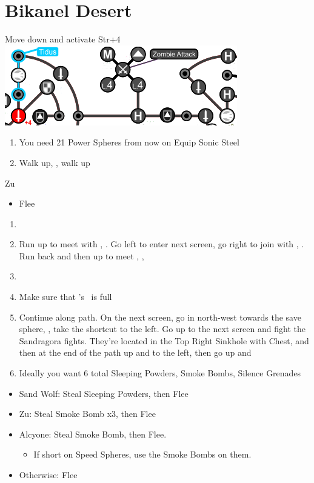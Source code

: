 \chapter{Bikanel Desert}
\begin{spheregrid}
\begin{itemize}
	\tidusf Move down and activate Str+4
	\includegraphics[width=.8\columnwidth]{graphics/tidus_bikanel}
\end{itemize}
\end{spheregrid}
\begin{enumerate}
	\item You need 21 Power Spheres from now on
	\tidusf Equip Sonic Steel
	\item Walk up, \sd, walk up
\end{enumerate}
\begin{battle}{Zu}
\begin{itemize}
	\tidusf Defend
	\tidusf Attack
	\tidusf Defend until all party members arrive
	\item Flee
\end{itemize}
\end{battle}
\begin{enumerate}[resume]
	\item \sd
	\item Run up to meet with \wakka, \sd. Go left to enter next screen, go right to join with \kimahri, \sd. Run back and then up to meet \rikku, \sd, \save
	\item \formation{\tidus}{\kimahri}{\auron}
	\item Make sure that \rikku's \od\ is full
	\item Continue along path. On the next screen, go in north-west towards the save sphere, \save, take the shortcut to the left. Go up to the next screen and fight the Sandragora fights. They're located in the Top Right Sinkhole with Chest, and then at the end of the path up and to the left, then go up and \sd
	\item Ideally you want 6 total Sleeping Powders, Smoke Bombs, Silence Grenades
\end{enumerate}
\begin{encounters}
\begin{itemize}
	\item Sand Wolf: Steal Sleeping Powders, then Flee
	\item Zu: Steal Smoke Bomb x3, then Flee
	\item Alcyone: Steal Smoke Bomb, then Flee.
	\begin{itemize}
		\item If short on Speed Spheres, use the Smoke Bombs on them.
	\end{itemize}
	\item Otherwise: Flee
\end{itemize}
\end{encounters}
